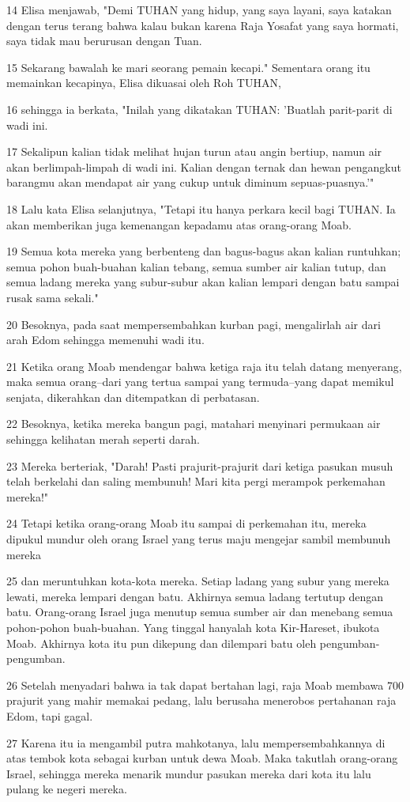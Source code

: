 \par 14 Elisa menjawab, "Demi TUHAN yang hidup, yang saya layani, saya katakan dengan terus terang bahwa kalau bukan karena Raja Yosafat yang saya hormati, saya tidak mau berurusan dengan Tuan.
\par 15 Sekarang bawalah ke mari seorang pemain kecapi." Sementara orang itu memainkan kecapinya, Elisa dikuasai oleh Roh TUHAN,
\par 16 sehingga ia berkata, "Inilah yang dikatakan TUHAN: 'Buatlah parit-parit di wadi ini.
\par 17 Sekalipun kalian tidak melihat hujan turun atau angin bertiup, namun air akan berlimpah-limpah di wadi ini. Kalian dengan ternak dan hewan pengangkut barangmu akan mendapat air yang cukup untuk diminum sepuas-puasnya.'"
\par 18 Lalu kata Elisa selanjutnya, "Tetapi itu hanya perkara kecil bagi TUHAN. Ia akan memberikan juga kemenangan kepadamu atas orang-orang Moab.
\par 19 Semua kota mereka yang berbenteng dan bagus-bagus akan kalian runtuhkan; semua pohon buah-buahan kalian tebang, semua sumber air kalian tutup, dan semua ladang mereka yang subur-subur akan kalian lempari dengan batu sampai rusak sama sekali."
\par 20 Besoknya, pada saat mempersembahkan kurban pagi, mengalirlah air dari arah Edom sehingga memenuhi wadi itu.
\par 21 Ketika orang Moab mendengar bahwa ketiga raja itu telah datang menyerang, maka semua orang--dari yang tertua sampai yang termuda--yang dapat memikul senjata, dikerahkan dan ditempatkan di perbatasan.
\par 22 Besoknya, ketika mereka bangun pagi, matahari menyinari permukaan air sehingga kelihatan merah seperti darah.
\par 23 Mereka berteriak, "Darah! Pasti prajurit-prajurit dari ketiga pasukan musuh telah berkelahi dan saling membunuh! Mari kita pergi merampok perkemahan mereka!"
\par 24 Tetapi ketika orang-orang Moab itu sampai di perkemahan itu, mereka dipukul mundur oleh orang Israel yang terus maju mengejar sambil membunuh mereka
\par 25 dan meruntuhkan kota-kota mereka. Setiap ladang yang subur yang mereka lewati, mereka lempari dengan batu. Akhirnya semua ladang tertutup dengan batu. Orang-orang Israel juga menutup semua sumber air dan menebang semua pohon-pohon buah-buahan. Yang tinggal hanyalah kota Kir-Hareset, ibukota Moab. Akhirnya kota itu pun dikepung dan dilempari batu oleh pengumban-pengumban.
\par 26 Setelah menyadari bahwa ia tak dapat bertahan lagi, raja Moab membawa 700 prajurit yang mahir memakai pedang, lalu berusaha menerobos pertahanan raja Edom, tapi gagal.
\par 27 Karena itu ia mengambil putra mahkotanya, lalu mempersembahkannya di atas tembok kota sebagai kurban untuk dewa Moab. Maka takutlah orang-orang Israel, sehingga mereka menarik mundur pasukan mereka dari kota itu lalu pulang ke negeri mereka.

